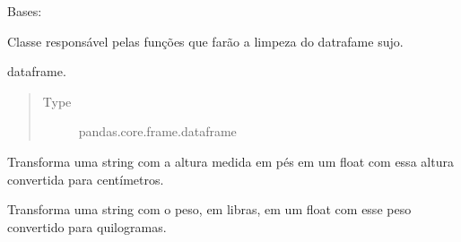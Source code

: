 \documentclass[letterpaper,10pt,brazil]{sphinxmanual}
\begin{document}
\begin{fulllineitems}
\label{\detokenize{classe_Fifa_limp:classe_Fifa_limp.Fifa_limp}}
Bases: 

Classe responsável pelas funções que farão a limpeza do datrafame sujo.

\begin{fulllineitems}
\label{\detokenize{classe_Fifa_limp:classe_Fifa_limp.Fifa_limp.dataframe}}
dataframe.
\begin{quote}\begin{description}
\item[{Type}] \leavevmode
pandas.core.frame.dataframe

\end{description}\end{quote}

\end{fulllineitems}


\begin{fulllineitems}
\label{\detokenize{classe_Fifa_limp:classe_Fifa_limp.Fifa_limp.trocar_pes_para_cm}}
Transforma uma string com a altura medida em pés em um float com essa altura convertida para centímetros.

\end{fulllineitems}


\begin{fulllineitems}
\label{\detokenize{classe_Fifa_limp:classe_Fifa_limp.Fifa_limp.trocar_lbs_para_kg}}
Transforma uma string com o peso, em libras, em um float com esse peso convertido para quilogramas.


\end{fulllineitems}
\end{fulllineitems}
\end{document}
